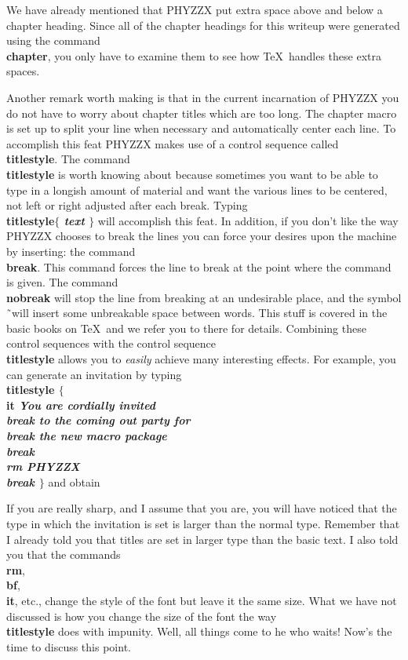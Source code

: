 We have already mentioned that PHYZZX put extra space
above and below a chapter heading.
Since all of the chapter headings for this writeup
were generated using
the command {\bf \\chapter}, you only have to examine them
to see how \TeX\ handles these extra spaces.
 
Another remark worth making is that in the current incarnation
of PHYZZX you do not have to worry about chapter titles which
are too long.
The chapter macro is set up to split your line when necessary
and automatically center each line.
To accomplish this feat PHYZZX makes use of a control sequence
called {\bf \\titlestyle}.
The command {\bf \\titlestyle} is worth knowing about because
sometimes you want to be able to type in a longish amount of
material and want the various lines to be centered, not left or
right adjusted after each break.
Typing {\bf \\titlestyle$\{$ {\it text} $\}$} will accomplish this feat.
In addition,
if you don't like the way PHYZZX chooses to break the lines
you can force your desires upon the machine by inserting: the
command {\bf \\break}.
This command forces the line to break at the point where the command is
given.
The command {\bf \\nobreak} will stop the line from
breaking at an undesirable place, and the symbol \~ \ will
insert some unbreakable space between words.
This stuff is covered in the basic books on \TeX\ and we refer you to
there for details.
Combining these control sequences with the control sequence
{\bf \\titlestyle} allows you to {\it easily}
achieve many interesting effects.
For example, you can generate an invitation by typing \hbreak
{\bf \\titlestyle $\{$ \\it \it You are cordially invited \bf \\break
\hbreak
\it to the coming out party for \bf \\break \hbreak
\it the new macro package \bf \\break \hbreak
\\rm \it PHYZZX \bf \\break $\}$ } \hbreak
and obtain
 
If you are really sharp, and I assume that you are, you will
have noticed that the type in which the invitation is set is larger
than the normal type.
Remember that I already told you that titles are set in larger
type than the basic text.
I also told you that the commands {\bf \\rm}, {\bf \\bf}, {\bf \\it},
etc., change the style of the font but leave it the same size.
What we have not discussed is how you change the size of the font
the way {\bf \\titlestyle} does with impunity.
Well, all things come to he who waits!
Now's the time to discuss this point.
 
